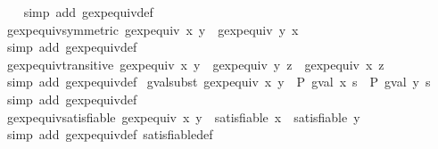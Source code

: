 \begin{isabellebody}
%
\isadelimproof
\ \ %
\endisadelimproof
%
\isatagproof
{}\isamarkupfalse%
\ {\isacharparenleft}simp\ add{\isacharcolon}\ gexp{\isacharunderscore}equiv{\isacharunderscore}def{\isacharparenright}%
\endisatagproof
{\isafoldproof}%
%
\isadelimproof
\isanewline
%
\endisadelimproof
\isanewline
{}\isamarkupfalse%
\ gexp{\isacharunderscore}equiv{\isacharunderscore}symmetric{\isacharcolon}\ {\isachardoublequoteopen}gexp{\isacharunderscore}equiv\ x\ y\ {\isasymLongrightarrow}\ gexp{\isacharunderscore}equiv\ y\ x{\isachardoublequoteclose}\isanewline
%
\isadelimproof
\ \ %
\endisadelimproof
%
\isatagproof
{}\isamarkupfalse%
\ {\isacharparenleft}simp\ add{\isacharcolon}\ gexp{\isacharunderscore}equiv{\isacharunderscore}def{\isacharparenright}%
\endisatagproof
{\isafoldproof}%
%
\isadelimproof
\isanewline
%
\endisadelimproof
\isanewline
{}\isamarkupfalse%
\ gexp{\isacharunderscore}equiv{\isacharunderscore}transitive{\isacharcolon}\ {\isachardoublequoteopen}gexp{\isacharunderscore}equiv\ x\ y\ {\isasymand}\ gexp{\isacharunderscore}equiv\ y\ z\ {\isasymLongrightarrow}\ gexp{\isacharunderscore}equiv\ x\ z{\isachardoublequoteclose}\isanewline
%
\isadelimproof
\ \ %
\endisadelimproof
%
\isatagproof
{}\isamarkupfalse%
\ {\isacharparenleft}simp\ add{\isacharcolon}\ gexp{\isacharunderscore}equiv{\isacharunderscore}def{\isacharparenright}%
\endisatagproof
{\isafoldproof}%
%
\isadelimproof
\isanewline
%
\endisadelimproof
\isanewline
{}\isamarkupfalse%
\ gval{\isacharunderscore}subst{\isacharcolon}\ {\isachardoublequoteopen}gexp{\isacharunderscore}equiv\ x\ y\ {\isasymLongrightarrow}\ P\ {\isacharparenleft}gval\ x\ s{\isacharparenright}\ {\isasymLongrightarrow}\ P\ {\isacharparenleft}gval\ y\ s{\isacharparenright}{\isachardoublequoteclose}\isanewline
%
\isadelimproof
\ \ %
\endisadelimproof
%
\isatagproof
{}\isamarkupfalse%
\ {\isacharparenleft}simp\ add{\isacharcolon}\ gexp{\isacharunderscore}equiv{\isacharunderscore}def{\isacharparenright}%
\endisatagproof
{\isafoldproof}%
%
\isadelimproof
\isanewline
%
\endisadelimproof
\isanewline
{}\isamarkupfalse%
\ gexp{\isacharunderscore}equiv{\isacharunderscore}satisfiable{\isacharcolon}\ {\isachardoublequoteopen}gexp{\isacharunderscore}equiv\ x\ y\ {\isasymLongrightarrow}\ satisfiable\ x\ {\isacharequal}\ satisfiable\ y{\isachardoublequoteclose}\isanewline
%
\isadelimproof
\ \ %
\endisadelimproof
%
\isatagproof
{}\isamarkupfalse%
\ {\isacharparenleft}simp\ add{\isacharcolon}\ gexp{\isacharunderscore}equiv{\isacharunderscore}def\ satisfiable{\isacharunderscore}def{\isacharparenright}%

\end{isabellebody}
